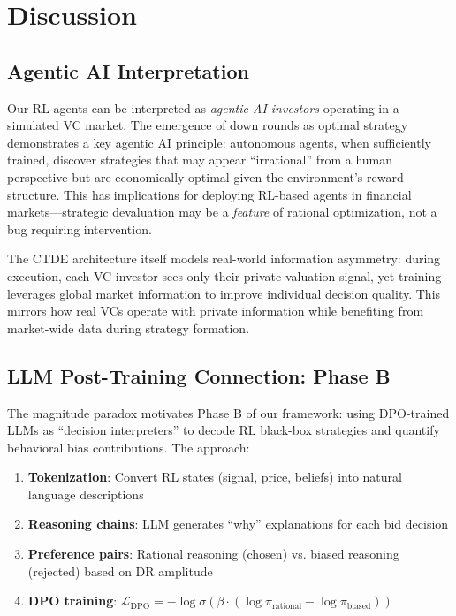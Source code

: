 \documentclass[11pt,a4paper]{article}
\begin{document}
\section{Discussion}

\subsection{Agentic AI Interpretation}

Our RL agents can be interpreted as \emph{agentic AI investors} operating in a simulated VC market. The emergence of down rounds as optimal strategy demonstrates a key agentic AI principle: autonomous agents, when sufficiently trained, discover strategies that may appear ``irrational'' from a human perspective but are economically optimal given the environment's reward structure. This has implications for deploying RL-based agents in financial markets---strategic devaluation may be a \emph{feature} of rational optimization, not a bug requiring intervention.

The CTDE architecture itself models real-world information asymmetry: during execution, each VC investor sees only their private valuation signal, yet training leverages global market information to improve individual decision quality. This mirrors how real VCs operate with private information while benefiting from market-wide data during strategy formation.

\subsection{LLM Post-Training Connection: Phase B}

The magnitude paradox motivates Phase B of our framework: using DPO-trained LLMs as ``decision interpreters'' to decode RL black-box strategies and quantify behavioral bias contributions. The approach:
\begin{enumerate}[nosep]
  \item \textbf{Tokenization}: Convert RL states (signal, price, beliefs) into natural language descriptions
  \item \textbf{Reasoning chains}: LLM generates ``why'' explanations for each bid decision
  \item \textbf{Preference pairs}: Rational reasoning (chosen) vs. biased reasoning (rejected) based on DR amplitude
  \item \textbf{DPO training}: $\mathcal{L}_{\text{DPO}} = -\log \sigma(\beta \cdot (\log \pi_{\text{rational}} - \log \pi_{\text{biased}}))$ \citep{rafailov2023}
\end{enumerate}
\end{document}
